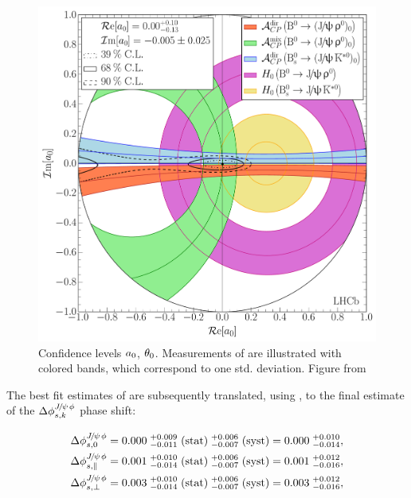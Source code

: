 \begin{figure}[!t]
  \centering
  \includegraphics[trim=0.0cm 0.0cm 0.0cm 0.0cm, clip=true,scale=0.39]{Figures/Chapter5/Penguin_Contribution_Re_vs_Im_allB2VV_Long_withH.pdf}
  \caption{Confidence levels $a_{0}$, $\theta_{0}$. Measurements of  are illustrated with
           colored bands, which correspond to one std. deviation. Figure from \cite{DeBruyn-thesis}}
  \label{pengPlot_long}
\end{figure}

The best fit estimates of  are subsequently translated, using ,
to the final estimate of the $\Delta\phi^{{J\mskip -3mu/\mskip -2mu\psi\mskip 2mu}\phi}_{s,{k}}$ phase shift:

\begin{subequations}
\label{delta_phis_result}
\begin{align}
\Delta\phi^{{J\mskip -3mu/\mskip -2mu\psi\mskip 2mu}\phi}_{s,{0}}         & = 0.000 \; ^{+0.009}_{-0.011} \; {\rm (stat)} \; ^{+0.006}_{-0.007} \; ({\rm syst}) = 0.000 \; ^{+0.010}_{-0.014},\\
\Delta\phi^{{J\mskip -3mu/\mskip -2mu\psi\mskip 2mu}\phi}_{s,{\parallel}} & = 0.001 \; ^{+0.010}_{-0.014} \; {\rm (stat)} \; ^{+0.006}_{-0.007} \; ({\rm syst)} = 0.001 \; ^{+0.012}_{-0.016},\\
\Delta\phi^{{J\mskip -3mu/\mskip -2mu\psi\mskip 2mu}\phi}_{s,{\perp}}     & = 0.003 \; ^{+0.010}_{-0.014} \; {\rm (stat)} \; ^{+0.006}_{-0.007} \; ({\rm syst)} = 0.003 \; ^{+0.012}_{-0.016},
\end{align}
\end{subequations}


